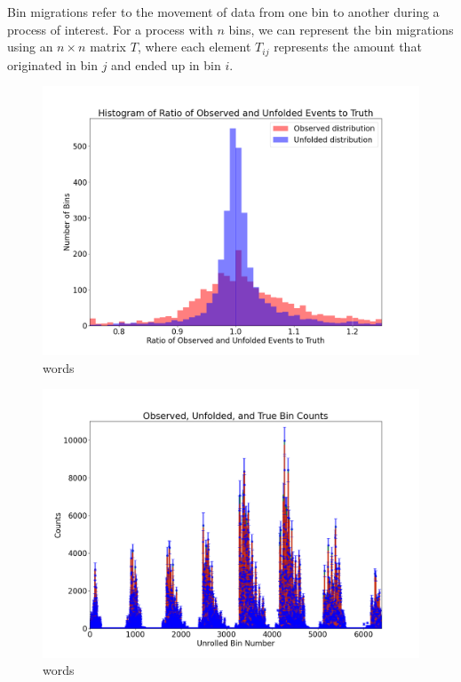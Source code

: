     
    Bin migrations refer to the movement of data from one bin to another during a process of interest. For a process with $n$ bins, we can represent the bin migrations using an $n \times n$ matrix $T$, where each element $T_{ij}$ represents the amount that originated in bin $j$ and ended up in bin $i$. 
    
    

    
    \begin{figure}[ht]
    \centering
    \includegraphics[trim={0 0 0 0},clip,width=\textwidth]{Chapters/Ch5-Further/0_IBU/pics/complete/histogram_of_ratio_of_observed_and_unfolded_events_to_truth.png}
    \caption[words]{words}
    \label{fig:ibu1}
    \end{figure}
    
    \begin{figure}[ht]
    \centering
    \includegraphics[trim={0 0 0 0},clip,width=\textwidth]{Chapters/Ch5-Further/0_IBU/pics/complete/observed_unfolded_and_true_bin_counts.png}
    \caption[words]{words}
    \label{fig:ibu2}
    \end{figure}
    
